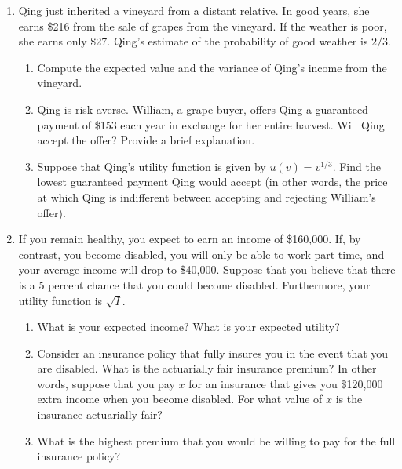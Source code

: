 \documentclass[11pt]{article}
\begin{document}
\begin{enumerate}
\begin{enumerate}
    \end{enumerate}

\item Qing just inherited a vineyard from a distant relative. In good years, she earns \$216 from the sale of grapes from the vineyard. If the weather is poor, she earns only \$27. Qing's estimate of the probability of good weather is $2/3$.
	\begin{enumerate}
	\item Compute the expected value and the variance of Qing's income from the vineyard.
	
	\item Qing is risk averse. William, a grape buyer, offers Qing a guaranteed payment of \$153 each year in exchange for her entire harvest. Will Qing accept the offer? Provide a brief explanation.
	
	\item Suppose that Qing's utility function is given by $u(v)=v^{1/3}$. Find the lowest guaranteed payment Qing would accept (in other words, the price at which Qing is indifferent between accepting and rejecting William's offer).
    \end{enumerate}

\item If you remain healthy, you expect to earn an income of \$160,000. If, by contrast, you become disabled, you will only be able to work part time, and your average income will drop to \$40,000. Suppose that you believe that there is a 5 percent chance that you could become disabled. Furthermore, your utility function is $\sqrt{I}$.
    \begin{enumerate}
    \item What is your expected income? What is your expected utility?

    \item Consider an insurance policy that fully insures you in the event that you are disabled. What is the actuarially fair insurance premium? In other words, suppose that you pay $x$ for an insurance that gives you \$120,000 extra income when you become disabled. For what value of $x$ is the insurance actuarially fair?

    \item What is the highest premium that you would be willing to pay for the full insurance policy?
    \end{enumerate}

\end{enumerate}
\end{document}
